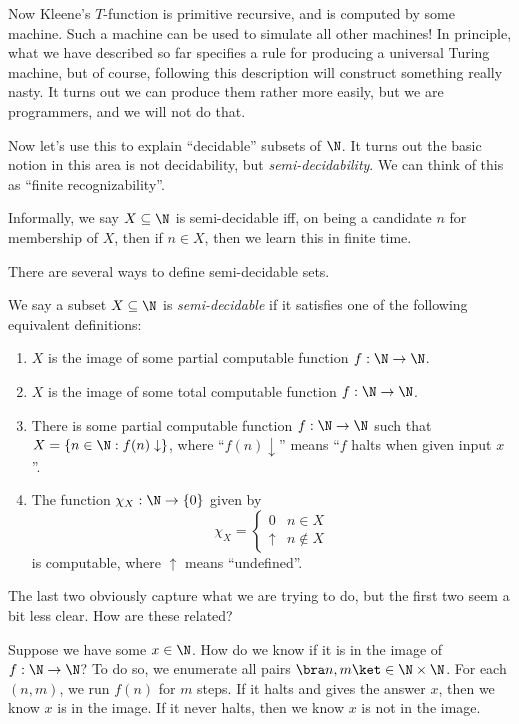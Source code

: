 \documentclass[a4paper]{article}
\begin{document}
Now Kleene's $T$-function is primitive recursive, and is computed by some machine. Such a machine can be used to simulate all other machines! In principle, what we have described so far specifies a rule for producing a universal Turing machine, but of course, following this description will construct something really nasty. It turns out we can produce them rather more easily, but we are programmers, and we will not do that.

Now let's use this to explain ``decidable'' subsets of $\N$. It turns out the basic notion in this area is not decidability, but \emph{semi-decidability}. We can think of this as ``finite recognizability''.

Informally, we say $X \subseteq \N$ is semi-decidable iff, on being a candidate $n$ for membership of $X$, then if $n \in X$, then we learn this in finite time.

There are several ways to define semi-decidable sets.
\begin{defi}
  We say a subset $X \subseteq \N$ is \emph{semi-decidable} if it satisfies one of the following equivalent definitions:
  \begin{enumerate}
    \item $X$ is the image of some partial computable function $f: \N \to \N$.
    \item $X$ is the image of some total computable function $f: \N \to \N$.
    \item There is some partial computable function $f: \N \to \N$ such that $X = \{n \in \N: f(n) \downarrow\}$, where ``$f(n) \downarrow$'' means ``$f$ halts when given input $x$''.\index{$\downarrow$}
    \item The function $\chi_X: \N \to \{0\}$ given by
      \[
        \chi_X =
        \begin{cases}
          0 & n \in X\\
          \uparrow & n\not\in X
        \end{cases}
      \]
      is computable, where \emph{$\uparrow$}\index{$\uparrow$} means ``undefined''.
  \end{enumerate}
\end{defi}
The last two obviously capture what we are trying to do, but the first two seem a bit less clear. How are these related?

Suppose we have some $x \in \N$. How do we know if it is in the image of $f: \N \to \N$? To do so, we enumerate all pairs $\bra n, m\ket \in \N \times \N$. For each $(n, m)$, we run $f(n)$ for $m$ steps. If it halts and gives the answer $x$, then we know $x$ is in the image. If it never halts, then we know $x$ is not in the image.
\end{document}
